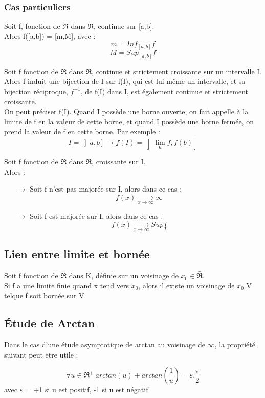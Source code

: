 \subsubsection{Cas particuliers}
\begin{prop}
Soit f, fonction de $\Re$ dans $\Re$, continue sur [a,b].\\
Alors f([a,b]) = [m,M], avec : 
$$m = Inf_{\left[a,b\right]}f $$
$$M = Sup_{\left[a,b\right]}f $$
\end{prop}
\begin{prop}
Soit f fonction de $\Re$ dans $\Re$, continue et strictement croissante sur un intervalle I.\\
Alors f induit une bijection de I sur f(I), qui est lui même un intervalle, et sa bijection réciproque, $f^{-1}$, de f(I) dans I, est également continue et strictement croissante.\\
On peut préciser f(I). Quand I possède une borne ouverte, on fait appelle à la limite de f en la valeur de cette borne, et quand I possède une borne fermée, on prend la valeur de f en cette borne. Par exemple : 
$$I = \left]a,b\right] \rightarrow f(I) = \left]\lim_a f,f(b) \right] $$
\end{prop}
\begin{prop}
Soit f fonction de $\Re$ dans $\Re$, croissante sur I.\\
Alors : 
\begin{itemize}
 \item[$\rightarrow$] Soit f n'est pas majorée sur I, alors dans ce cas :  $$f(x) \underset{x \rightarrow\infty}\rightarrow \infty$$
 \item[$\rightarrow$] Soit f est majorée sur I, alors dans ce cas : $$f(x) \underset{x \rightarrow\infty}\rightarrow Sup\underset{I} f$$
\end{itemize}
\end{prop}
\subsection{Lien entre limite et bornée}
\begin{prop}
Soit f fonction de $\Re$ dans K, définie sur un voisinage de $x_0 \in \bar{\Re}$.\\
Si f a une limite finie quand x tend vers $x_0$, alors il existe un voisinage de $x_0$ V telque f soit bornée sur V. 
\end{prop}
\subsection{Étude de Arctan}
Dans le cas d'une étude asymptotique de arctan au voisinage de $\infty$, la propriété suivant peut etre utile : 
\begin{prop}
$$\forall u \in \Re^+ ~ arctan(u)+arctan(\dfrac{1}{u}) = \varepsilon.\dfrac{\pi}{2}$$
avec $\varepsilon$ = +1 si u est positif, -1 si u est négatif
\end{prop}
